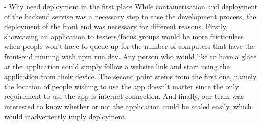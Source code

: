 - Why need deployment in the first place
While containerisation and deployment of the backend servise was a necessary step to ease the development process, the deployment of the front end was necessary for different reasons. Firstly, showcasing an application to testers/focus groups would be more frictionless when people won't have to queue up for the number of computers that have the front-end running with npm run dev. Any person who would like to have a glace at the application could simply follow a website link and start using the application from their device. The second point stems from the first one, namely, the location of people wishing to use the app doesn't matter since the only requirement to use the app is internet connection. And finally, our team was interested to know whether or not the application could be scaled easily, which would inadvertently imply deployment. 

